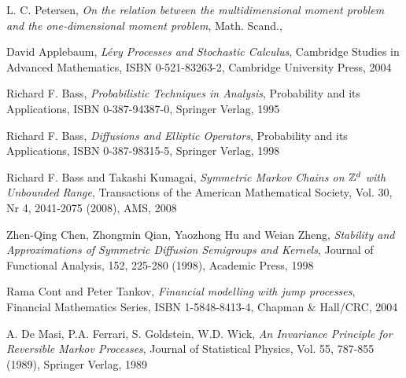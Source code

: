 \setcounter{page}{42}
\renewcommand{\thepage}{\arabic{page}}
\pagestyle{plain}



\begin{thebibliography}{[88]}

      L. C. Petersen,
      \emph{On the relation between the multidimensional moment problem
              and the one-dimensional moment problem},
      Math. Scand.,


     David Applebaum,
     \emph{L\'evy Processes and Stochastic Calculus},
     Cambridge Studies in Advanced Mathematics,
     ISBN 0-521-83263-2,
     Cambridge University Press, 2004

     Richard F. Bass,
     \emph{Probabilistic Techniques in Analysis},
     Probability and its Applications,
     ISBN 0-387-94387-0,
     Springer Verlag, 1995

     Richard F. Bass,
     \emph{Diffusions and Elliptic Operators},
     Probability and its Applications,
     ISBN 0-387-98315-5,
     Springer Verlag, 1998

     Richard F. Bass and Takashi Kumagai,
     \emph{Symmetric Markov Chains on $\mathbb{Z}^d$ with Unbounded Range},
     Transactions of the American Mathematical Society,          
     Vol. 30, Nr 4, 2041-2075 (2008),
     AMS, 2008

     Zhen-Qing Chen, Zhongmin Qian, Yaozhong Hu and Weian Zheng,
     \emph{Stability and Approximations of Symmetric Diffusion Semigroups and Kernels},
     Journal of Functional Analysis, 152, 225-280 (1998),                             
     Academic Press, 1998 

     Rama Cont and Peter Tankov,
     \emph{Financial modelling with jump processes},
     Financial Mathematics Series,
     ISBN 1-5848-8413-4,
     Chapman \& Hall/CRC, 2004

     A. De Masi, P.A. Ferrari, S. Goldstein, W.D. Wick,
     \emph{An Invariance Principle for Reversible Markov Processes},
     Journal of Statistical Physics, Vol. 55, 787-855 (1989),
     Springer Verlag, 1989 


\end{thebibliography}

